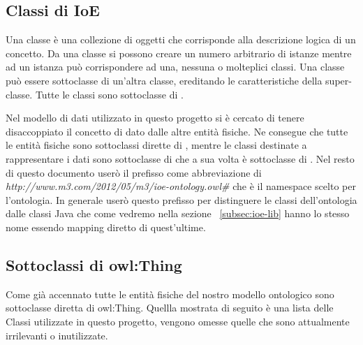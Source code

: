 \subsection{Classi di IoE}

Una classe è una collezione di oggetti che corrisponde alla descrizione logica di un concetto. Da una classe si possono creare un numero arbitrario di istanze mentre ad un istanza può corrispondere ad una, nessuna o molteplici classi.\newline
Una classe può essere sottoclasse di un'altra classe, ereditando le caratteristiche della super-classe. Tutte le classi sono sottoclasse di .

Nel modello di dati utilizzato in questo progetto si è cercato di tenere disaccoppiato il concetto di dato dalle altre entità fisiche. Ne consegue che tutte le entità fisiche sono sottoclassi dirette di , mentre le classi destinate a rappresentare i dati sono sottoclasse di  che a sua volta è sottoclasse di .\newline
Nel resto di questo documento userò il prefisso  come abbreviazione di \emph{http://www.m3.com/2012/05/m3/ioe-ontology.owl\#} che è il namespace scelto per l'ontologia. In generale userò questo prefisso per distinguere le classi dell'ontologia dalle classi Java che come vedremo nella sezione ~\ref{subsec:ioe-lib} hanno lo stesso nome essendo mapping diretto di quest'ultime.

\subsection{Sottoclassi di owl:Thing}\label{subsec:thing}

Come già accennato tutte le entità fisiche del nostro modello ontologico sono sottoclasse diretta di owl:Thing. Quellla mostrata di seguito è una lista delle Classi utilizzate in questo progetto, vengono omesse quelle che sono attualmente irrilevanti o inutilizzate.

